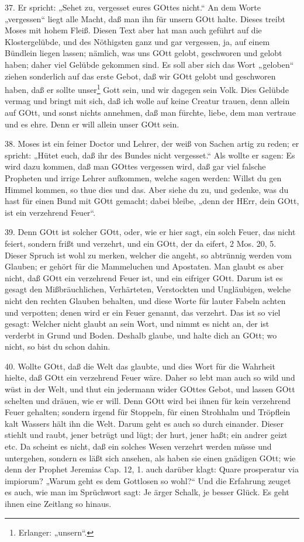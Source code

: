 37. Er spricht: „Sehet zu, vergesset eures GOttes nicht.“ An dem Worte „vergessen“ liegt alle Macht, daß man ihn für unsern GOtt halte. Dieses treibt Moses mit hohem Fleiß. Diesen Text aber hat man auch geführt auf die Klostergelübde, und des Nöthigsten ganz und gar vergessen, ja, auf einem Bündlein liegen lassen; nämlich, was uns GOtt gelobt, geschworen und gelobt haben; daher viel Gelübde gekommen sind. Es soll aber sich das Wort „geloben“ ziehen sonderlich auf das erste Gebot, daß wir GOtt gelobt und geschworen haben, daß er sollte unser\footnote{Erlanger: „unsern“.} Gott sein, und wir dagegen sein Volk. Dies Gelübde vermag und bringt mit sich, daß ich wolle auf keine Creatur trauen, denn allein auf GOtt, und sonst nichts annehmen, daß man fürchte, liebe, dem man vertraue und es ehre. Denn er will allein unser GOtt sein.

38. Moses ist ein feiner Doctor und Lehrer, der weiß von Sachen artig zu reden; er spricht: „Hütet euch, daß ihr des Bundes nicht vergesset.“ Als wollte er sagen: Es wird dazu kommen, daß man GOttes vergessen wird, daß gar viel falsche Propheten und irrige Lehrer aufkommen, welche sagen werden: Willst du gen Himmel kommen, so thue dies und das. Aber siehe du zu, und gedenke, was du hast für einen Bund mit GOtt gemacht; dabei bleibe, „denn der HErr, dein GOtt, ist ein verzehrend Feuer“.

39. Denn GOtt ist solcher GOtt, oder, wie er hier sagt, ein solch Feuer, das nicht feiert, sondern frißt und verzehrt, und ein GOtt, der da eifert, 2 Mos. 20, 5. Dieser Spruch ist wohl zu merken, welcher die angeht, so abtrünnig werden vom Glauben; er gehört für die Mammeluchen und Apostaten. Man glaubt es aber nicht, daß GOtt ein verzehrend Feuer ist, und ein eifriger GOtt. Darum ist es gesagt den Mißbräuchlichen, Verhärteten, Verstockten und Ungläubigen, welche nicht den rechten Glauben behalten, und diese Worte für lauter Fabeln achten und verpotten; denen wird er ein Feuer genannt, das verzehrt. Das ist so viel gesagt: Welcher nicht glaubt an sein Wort, und nimmt es nicht an, der ist verderbt in Grund und Boden. Deshalb glaube, und halte dich an GOtt; wo nicht, so bist du schon dahin.

40. Wollte GOtt, daß die Welt das glaubte, und dies Wort für die Wahrheit hielte, daß GOtt ein verzehrend Feuer wäre. Daher so lebt man auch so wild und wüst in der Welt, und thut ein jedermann wider GOttes Gebot, und lassen GOtt schelten und dräuen, wie er will. Denn GOtt wird bei ihnen für kein verzehrend Feuer gehalten; sondern irgend für Stoppeln, für einen Strohhalm und Tröpflein kalt Wassers hält ihn die Welt. Darum geht es auch so durch einander. Dieser stiehlt und raubt, jener betrügt und lügt; der hurt, jener haßt; ein andrer geizt etc. Da scheint es nicht, daß ein solches Wesen verzehrt werden müsse und untergehen, sondern es läßt sich ansehen, als haben sie einen gnädigen GOtt; wie denn der Prophet Jeremias Cap. 12, 1. auch darüber klagt: Quare prosperatur via impiorum? „Warum geht es dem Gottlosen so wohl?“ Und die Erfahrung zeuget es auch, wie man im Sprüchwort sagt: Je ärger Schalk, je besser Glück. Es geht ihnen eine Zeitlang so hinaus.


